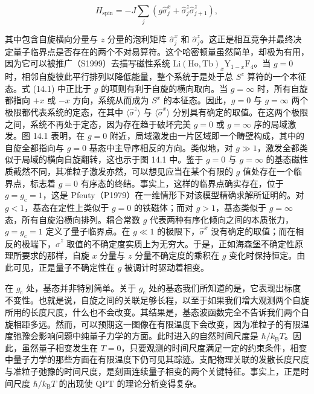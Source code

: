 \begin{equation*}
H_{\mathrm{spin}} = -J \sum_j \left( g\hat{\sigma}_j^x + \hat{\sigma}_j^z \hat{\sigma}_{j+1}^z \right),\tag{14.1}
\end{equation*}

其中包含自旋横向分量与 $z$ 分量的泡利矩阵 $\hat{\sigma}_j^x$ 和 $\hat{\sigma}_j^z$。这正是相互竞争并最终决定量子临界点是否存在的两个不对易算符。这个哈密顿量虽然简单，却极为有用，因为它可以被推广（S1999）去描写磁性系统 $\mathrm{Li}(\mathrm{Ho},\mathrm{Tb})_x\mathrm{Y}_{1-x}\mathrm{F}_4$。当 $g=0$ 时，相邻自旋彼此平行排列以降低能量，整个系统于是处于总 $S^z$ 算符的一个本征态。式 (14.1) 中正比于 $g$ 的项则有利于自旋的横向取向。当 $g=\infty$ 时，所有自旋都指向 $+x$ 或 $-x$ 方向，系统从而成为 $S^x$ 的本征态。因此，$g=0$ 与 $g=\infty$ 两个极限都代表系统的定态，在其中 $\langle\hat{\sigma}^z\rangle$ 与 $\langle\hat{\sigma}^x\rangle$ 分别具有确定的取值。在这两个极限之间，系统不再处于定态，因为存在趋于破坏完美 $g=0$ 或 $g=\infty$ 序的局域激发。图 14.1 表明，在 $g=0$ 附近，局域激发由一片区域即一个畴壁构成，其中的自旋全都指向与 $g=0$ 基态中主导序相反的方向。类似地，对 $g\gg 1$，激发全都类似于局域的横向自旋翻转，这也示于图 14.1 中。鉴于 $g=0$ 与 $g=\infty$ 的基态磁性质截然不同，其准粒子激发亦然，可以想见应当在某个有限的 $g$ 值处存在一个临界点，标志着 $g=0$ 有序态的终结。事实上，这样的临界点确实存在，位于 $g=g_{\mathrm{c}}=1$，这是 Pfeuty（P1979）在一维情形下对该模型精确求解所证明的。对 $g<1$，基态在定性上类似于 $g=0$ 的铁磁体；而对 $g>1$，基态类似于 $g=\infty$ 态，所有自旋沿横向排列。耦合常数 $g$ 代表两种有序化倾向之间的本质张力，$g=g_{\mathrm{c}}=1$ 定义了量子临界点。在 $g\ll 1$ 的极限下，$\hat{\sigma}^x$ 没有确定的取值；而在相反的极端下，$\hat{\sigma}^z$ 取值的不确定度实质上为无穷大。于是，正如海森堡不确定性原理所要求的那样，自旋 $x$ 分量与 $z$ 分量不确定度的乘积在 $g$ 变化时保持恒定。由此可见，正是量子不确定性在 $g$ 被调计时驱动着相变。

在 $g_{\mathrm{c}}$ 处，基态并非特别简单。关于 $g_{\mathrm{c}}$ 处的基态我们所知道的是，它表现出标度不变性。也就是说，自旋之间的关联足够长程，以至于如果我们增大观测两个自旋所用的长度尺度，什么也不会改变。其结果是，基态波函数完全不告诉我们两个自旋相距多远。然而，可以预期这一图像在有限温度下会改变，因为准粒子的有限温度弛豫会影响问题中纯量子力学的方面。此时进入的自然时间尺度是 $\hbar/k_{\mathrm{B}}T$。因此，虽然量子相变发生在 $T=0$，只要观测的时间尺度满足一定的约束条件，相变中量子力学的那些方面在有限温度下仍可见其踪迹。支配物理关联的发散长度尺度与准粒子弛豫的时间尺度，是刻画连续量子相变的两个关键特征。事实上，正是时间尺度 $\hbar/k_{\mathrm{B}}T$ 的出现使 QPT 的理论分析变得复杂。

